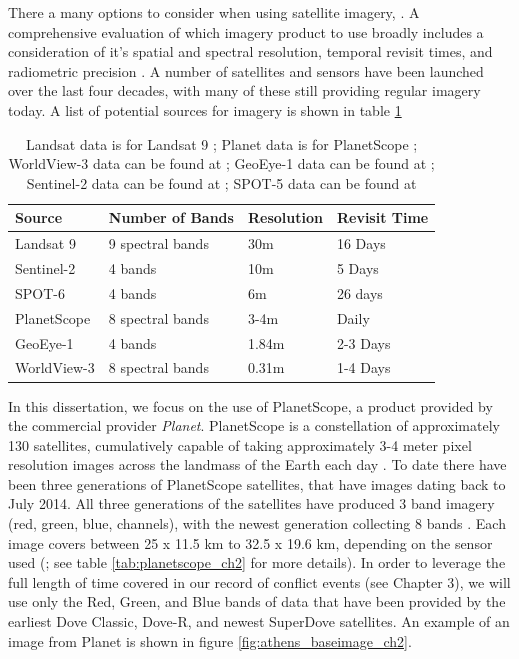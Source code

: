 There a many options to consider when using satellite imagery, \citep{kramer2008overview}.  A comprehensive evaluation of which imagery product to use broadly includes a consideration of it's spatial and spectral resolution, temporal revisit times, and radiometric precision \citep{xie2008remote}.  A number of satellites and sensors have been launched over the last four decades, with many of these still providing regular imagery today.  A list of potential sources for imagery is shown in table \ref{tab:sat_options} 


\begin{table}
\centering
\begin{tabular}{ |l||l|l|l|  }

\hline
 \textbf{Source} & \textbf{Number of Bands} & \textbf{Resolution} & \textbf{Revisit Time} \\
 \hline
 Landsat 9 & 9 spectral bands  & 30m & 16 Days \\
 \hline
  Sentinel-2 & 4 bands & 10m & 5 Days \\
 \hline
  SPOT-6 &  4 bands & 6m & 26 days \\
 \hline
 PlanetScope & 8 spectral bands & 3-4m & Daily \\
 \hline
 GeoEye-1 & 4 bands & 1.84m  & 2-3 Days \\
 \hline
 WorldView-3 & 8 spectral bands & 0.31m & 1-4 Days\\
 \hline


\end{tabular}
\caption{Landsat data is for Landsat 9 \citep{USGSlandsat}; Planet data is for PlanetScope \citep{planetScope}; WorldView-3 data can be found at \citep{maxar_worldview3}; GeoEye-1 data can be found at \citep{maxar_geoeye}; Sentinel-2 data can be found at \citep{copernicus_sentinel2}; SPOT-5 data can be found at \citep{spot6_esa} }
\label{tab:sat_options}
\end{table}

In this dissertation, we focus on the use of PlanetScope, a product provided by the commercial provider \textit{Planet}. PlanetScope is a constellation of approximately 130 satellites, cumulatively capable of taking approximately 3-4 meter pixel resolution images across the landmass of the Earth each day \citep{planet}.  To date there have been three generations of PlanetScope satellites, that have images dating back to July 2014.  All three generations of the satellites have produced 3 band imagery (red, green, blue, channels), with the newest generation collecting 8 bands \citep{planet}.  Each image covers between 25 x 11.5 km to 32.5 x 19.6 km, depending on the sensor used (\cite{planet}; see table \ref{tab:planetscope_ch2} for more details).  In order to leverage the full length of time covered in our record of conflict events (see Chapter 3), we will use only the Red, Green, and Blue bands of data that have been provided by the earliest Dove Classic, Dove-R, and newest SuperDove satellites.  An example of an image from Planet is shown in figure \ref{fig:athens_baseimage_ch2}.


